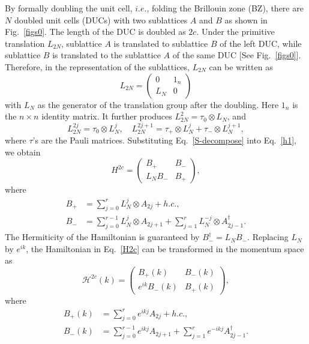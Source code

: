 \documentclass[aps,prl,twocolumn,noshowpacs,superscriptaddress]{revtex4-1}
\def \H {\mathcal{H}}
\begin{document}
By formally doubling the unit cell, $ i.e. $, folding the Brillouin zone (BZ), there are $ N $ doubled unit cells (DUCs) with two sublattices $ A $ and $ B $ as shown in Fig.~\ref{figs0}. The length of the DUC is doubled as $ 2c $. Under the primitive translation $ L_{2N} $, sublattice $ A $ is translated to sublattice $ B $ of the left DUC, while sublattice $ B $ is translated to the sublattice $ A $ of the same DUC [See Fig.~\ref{figs0}]. Therefore, in the representation of the sublattices, $ L_{2N} $ can be written as
\begin{equation}
	L_{2N}=\begin{pmatrix}
		0 & 1_n\\ L_N & 0
	\end{pmatrix}
\end{equation}
with $ L_N $ as the generator of the translation group after the doubling. Here $ 1_n $ is the $ n\times n $ identity matrix. It further produces $ L_{2N}^2=\tau_0\otimes L_N $, and
\begin{equation}\label{S-decompose}
	L_{2N}^{2j}=\tau_0\otimes L_N^j,\quad L_{2N}^{2j+1}=\tau_+\otimes L_{N}^j+\tau_-\otimes L_{N}^{j+1},
\end{equation}
where $ \tau $'s are the Pauli matrices. Substituting Eq.~\eqref{S-decompose} into Eq.~\eqref{h1}, we obtain
\begin{equation}\label{H2c}
	H^{2c}=\begin{pmatrix}
		B_+ & B_- \\ L_NB_- & B_+
	\end{pmatrix},
\end{equation}
where
\begin{equation}
	\begin{split}
		B_+&=\sum_{j=0}^{r}L_N^j\otimes A_{2j}+h.c.,\\
		B_-&=\sum_{j=0}^{r-1}L_N^j\otimes A_{2j+1}+\sum_{j=1}^{r}L_N^{-j}\otimes A_{2j-1}^\dagger.
	\end{split}
\end{equation}
The Hermiticity of the Hamiltonian is guaranteed by $ B_-^\dagger=L_NB_- $. Replacing $ L_N $ by $ e^{ik} $, the Hamiltonian in Eq.~\eqref{H2c} can be transformed in the momentum space as 
\begin{equation}\label{H2ck}
	\H^{2c}(k)=\begin{pmatrix}
		B_+(k) & B_-(k) \\ e^{ik}B_-(k) & B_+(k)
	\end{pmatrix},
\end{equation}
where
\begin{equation}\label{BB}
	\begin{split}
		B_+(k)&=\sum_{j=0}^{r}e^{ikj} A_{2j}+h.c.,\\
		B_-(k)&=\sum_{j=0}^{r-1}e^{ikj} A_{2j+1}+\sum_{j=1}^{r}e^{-ikj} A_{2j-1}^\dagger.
	\end{split}
\end{equation}
\end{document}
